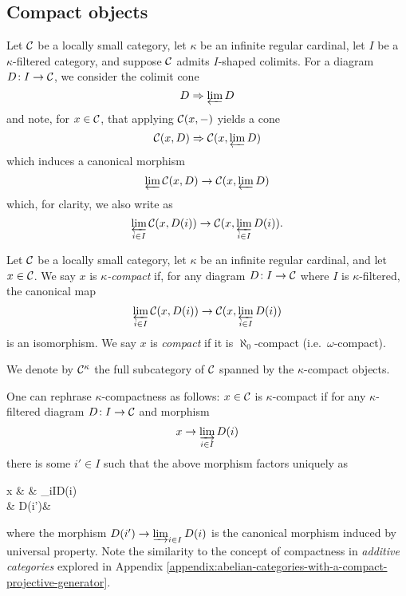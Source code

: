 \subsection{Compact objects}
\begin{construction}
	Let \(\calC\) be a locally small category, let \(\kappa\) be an infinite regular cardinal, let \(I\) be a \(\kappa\)-filtered category, and suppose \(\calC\) admits \(I\)-shaped colimits. For a diagram \(D\!:I\to\calC\),
	we consider the colimit cone
	\[ D\To \projlim{D} \]
	and note, for \(x\in\calC\), that applying \(\calC(x,-)\) yields a cone
	\[ \calC(x,D)\To \calC(x,\projlim{D}) \]
	which induces a canonical morphism
	\[ \projlim\calC(x,D)\to\calC(x,\projlim{D}) \]
	which, for clarity, we also write as
	\[ \projlim_{i\in I}\calC(x,D(i))\to\calC(x,\projlim_{i\in I}{D(i)}). \]
\end{construction}
\begin{definition}
	Let \(\calC\) be a locally small category, let \(\kappa\) be an infinite regular cardinal, and let \(x\in\calC\). We say \(x\) is \(\kappa\)\emph{-compact} if, for any diagram \(D\!:I\to\calC\) where \(I\) is \(\kappa\)-filtered,
	the canonical map
	\[ \projlim_{i\in I}\calC(x,D(i))\to\calC(x,\projlim_{i\in I}{D(i)}) \]
	is an isomorphism. We say \(x\) is \emph{compact} if it is \(\aleph_0\)-compact (i.e.\ \(\omega\)-compact).

	We denote by \(\calC^\kappa\) the full subcategory of \(\calC\) spanned by the \(\kappa\)-compact objects.
\end{definition}
\begin{remark}
	One can rephrase \(\kappa\)-compactness as follows: \(x\in\calC\) is \(\kappa\)-compact if for any \(\kappa\)-filtered diagram \(D\!: I\to\calC\) and morphism
	\[ x \to \injlim_{i\in I}D(i) \]
	there is some \(i'\in I\) such that the above morphism factors uniquely as
	\begin{diagram*}[row sep=small]
		x \ar[rr]\ar[dr,dashed] & & \injlim_{i\in I}D(i)\\
		 & D(i')\ar[ur] &
	\end{diagram*}
	where the morphism \(D(i')\to\injlim_{i\in I}D(i)\) is the canonical morphism induced by universal property. Note the similarity to the concept of compactness in \emph{additive categories}
	explored in Appendix \ref{appendix:abelian-categories-with-a-compact-projective-generator}.
\end{remark}
